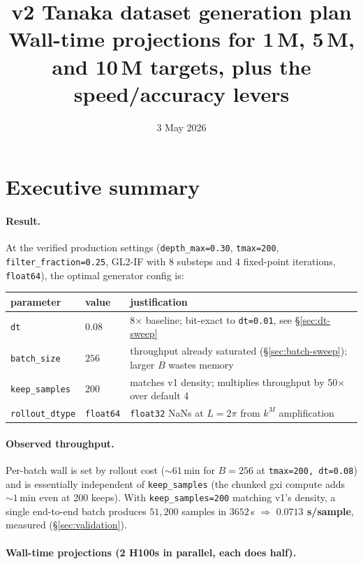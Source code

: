 \documentclass[11pt]{article}
\title{v2 Tanaka dataset generation plan\\
\large Wall-time projections for 1\,M, 5\,M, and 10\,M targets, plus the speed/accuracy levers}
\author{}
\date{3 May 2026}
\begin{document}
\maketitle

\section*{Executive summary}

\paragraph{Result.} At the verified production settings (\texttt{depth\_max=0.30},
\texttt{tmax=200}, \texttt{filter\_fraction=0.25}, GL2-IF with 8 substeps and 4 fixed-point
iterations, \texttt{float64}), the optimal generator config is:

\begin{center}
\begin{tabular}{lll}
\toprule
parameter & value & justification \\
\midrule
\texttt{dt} & $0.08$ & 8$\times$ baseline; bit-exact to \texttt{dt=0.01}, see \S\ref{sec:dt-sweep} \\
\texttt{batch\_size} & $256$ & throughput already saturated (\S\ref{sec:batch-sweep}); larger $B$ wastes memory \\
\texttt{keep\_samples} & $200$ & matches v1 density; multiplies throughput by 50$\times$ over default 4 \\
\texttt{rollout\_dtype} & \texttt{float64} & \texttt{float32} NaNs at $L=2\pi$ from $k^M$ amplification \\
\bottomrule
\end{tabular}
\end{center}

\paragraph{Observed throughput.} Per-batch wall is set by rollout cost
($\sim\!61$\,min for $B=256$ at \texttt{tmax=200, dt=0.08}) and is essentially
independent of \texttt{keep\_samples} (the chunked gxi compute adds $\sim\!1$\,min
even at 200 keeps). With \texttt{keep\_samples=200} matching v1's density, a single
end-to-end batch produces $51{,}200$ samples in $3652$\,s
$\Rightarrow$ \textbf{$0.0713$ s/sample}, measured (\S\ref{sec:validation}).

\paragraph{Wall-time projections (2 H100s in parallel, each does half).}
\end{document}
